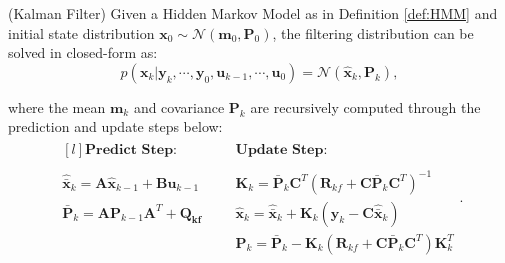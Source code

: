 \documentclass[a4paper,11pt]{book}
\numberwithin{figure}{chapter}
\numberwithin{equation}{chapter}
\numberwithin{table}{chapter}
\newtheorem{theorem}{Theorem}[chapter]
\theoremstyle{definition}
\newcounter{boxed-theorem}
\newenvironment{boxed-theorem}[1]
{\begin{shaded} \begin{theorem}{#1}}
{\end{theorem} \end{shaded}}
\newcounter{boxed-definition}
\begin{document}
\begin{boxed-theorem}{(Kalman Filter)} \label{th:kalmanFilter}
    Given a Hidden Markov Model as in Definition \ref{def:HMM} and initial state distribution $\bm{x}_0 \sim \mathcal{N}(\bm{m}_0, \bm{P}_0)$, the filtering distribution can be solved in closed-form as:
    \begin{equation}
        p(\bm{x}_k | \bm{y}_{k}, \cdots, \bm{y}_0, \bm{u}_{k-1}, \cdots, \bm{u}_0)  = \mathcal{N}(\hat{\bm{x}}_k, \bm{P}_k)
    ,\end{equation}   
    
    \noindent where the mean $\bm{m}_k$ and covariance $\bm{P}_k$ are recursively computed through the prediction and update steps below:
    \begin{align}
    \begin{matrix*}[l]
    \textbf{Predict Step:} & & & \textbf{Update Step:} \\ \\
    \hat{\bar{\bm{x}}}_k = \bm{A} \hat{\bm{x}}_{k-1} + \bm{B} \bm{u}_{k-1} & & & \bm{K}_k = \bar{\bm{P}}_k \bm{C}^T (\bm{R}_{kf} + \bm{C} \bar{\bm{P}}_k \bm{C}^T)^{-1} \\
    \bar{\bm{P}}_k = \bm{A} \bm{P}_{k-1} \bm{A}^T + \bm{Q_{kf}} & & & \hat{\bm{x}}_k = \hat{\bar{\bm{x}}}_k + \bm{K}_k(\bm{y}_k - \bm{C} \hat{\bar{\bm{x}}}_k)\ \\
    & & & \bm{P}_k = \bar{\bm{P}}_k - \bm{K}_k (\bm{R}_{kf} + \bm{C} \bar{\bm{P}}_k \bm{C}^T) \bm{K}_k^T
    \end{matrix*}   
    .\end{align}
\end{boxed-theorem}
\end{document}
